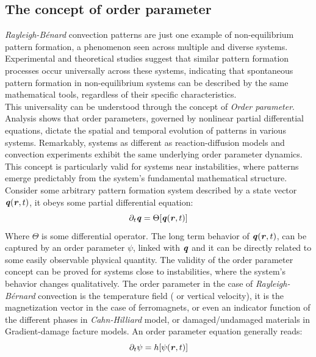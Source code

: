 \documentclass[11pt]{article}
\begin{document}
\subsection{The concept of order parameter}
\emph{Rayleigh-Bénard} convection patterns are just one example of non-equilibrium pattern formation, a phenomenon seen across multiple and diverse systems. Experimental and theoretical studies suggest that similar pattern formation processes occur universally across these systems, indicating that spontaneous pattern formation in non-equilibrium systems can be described by the same mathematical tools, regardless of their specific characteristics.\\
This universality can be understood through the concept of \emph{Order parameter}. Analysis shows that order parameters, governed by nonlinear partial differential equations, dictate the spatial and temporal evolution of patterns in various systems. Remarkably, systems as different as reaction-diffusion models and convection experiments exhibit the same underlying order parameter dynamics. This concept is particularly valid for systems near instabilities, where patterns emerge predictably from the system's fundamental mathematical structure. Consider some arbitrary pattern formation system described by a state vector $\bm{\mathit{q}}(\bm{\mathit{r}},t)$, it obeys some partial differential equation:
\begin{equation}
    \partial_t \bm{\mathit{q}} = \Theta [\bm{\mathit{q}}(\bm{\mathit{r}},t)]
\end{equation}
Where $\Theta$ is some differential operator. The long term behavior of $\bm{\mathit{q}}(\bm{\mathit{r}},t)$, can be captured by an order parameter $\psi$, linked with $\bm{\mathit{q}}$ and it can be directly related to some easily observable physical quantity. The validity of the order parameter concept can be proved for systems close to instabilities, where the system’s behavior changes qualitatively. The order parameter in the case of \emph{Rayleigh-Bérnard} convection is the temperature field ( or vertical velocity), it is the magnetization vector in the case of ferromagnets, or even an indicator function of the different phases in \emph{Cahn-Hilliard} model, or damaged/undamaged materials in Gradient-damage facture models. An order parameter equation generally reads:
\begin{equation}
    \partial_t \psi = h [\psi(\bm{\mathit{r}},t)]
\end{equation}
\end{document}
